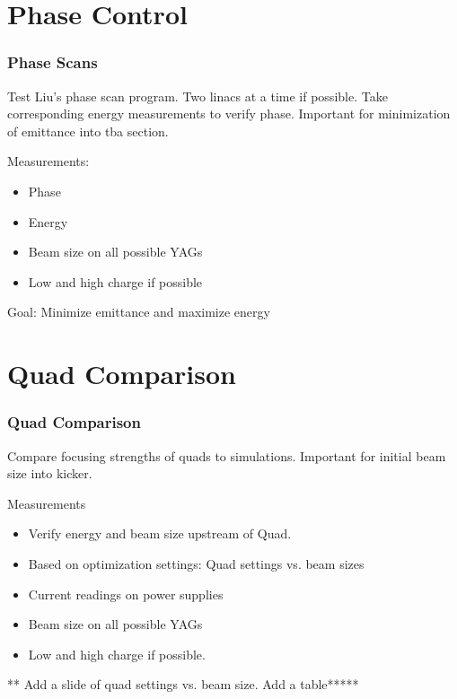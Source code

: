 \documentclass[professionalfonts,t]{beamer}
\begin{document}

\section{Phase Control}
\begin{frame}
\frametitle{Phase Scans}
Test Liu's phase scan program.
Two linacs at a time if possible.
Take corresponding energy measurements to verify phase.
Important for minimization of emittance into tba section. 

\vspace{1em}
Measurements:
\begin{itemize}
	\item Phase 
	\item Energy 
	\item Beam size on all possible YAGs
	\item Low and high charge if possible
\end{itemize}

\vspace{1em}
Goal: Minimize emittance and maximize energy
\end{frame}


\section{Quad Comparison}
\begin{frame}
\frametitle{Quad Comparison}
	Compare focusing strengths of quads to simulations.
	Important for initial beam size into kicker.

\vspace{1em}	
Measurements
	\begin{itemize}
		\item Verify energy and beam size upstream of Quad. 
		\item Based on optimization settings: Quad settings vs. beam sizes
		\item Current readings on power supplies
		\item Beam size on all possible YAGs
		\item Low and high charge if possible.
	\end{itemize}

** Add a slide of quad settings vs. beam size.
Add a table*****
\end{frame}
\end{document}
